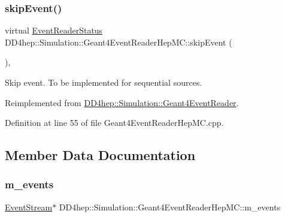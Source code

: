 \subsubsection{\texorpdfstring{skip\+Event()}{skipEvent()}}
{\footnotesize\ttfamily virtual \hyperlink{class_d_d4hep_1_1_simulation_1_1_geant4_event_reader_ae4f4bc83ffcf5b0c1868ad78859851e7}{Event\+Reader\+Status} D\+D4hep\+::\+Simulation\+::\+Geant4\+Event\+Reader\+Hep\+M\+C\+::skip\+Event (\begin{DoxyParamCaption}{ }\end{DoxyParamCaption})\hspace{0.3cm}{\ttfamily [inline]}, {\ttfamily [virtual]}}



Skip event. To be implemented for sequential sources. 



Reimplemented from \hyperlink{class_d_d4hep_1_1_simulation_1_1_geant4_event_reader_a9381626ad4f4fa20e304414f6654ee03}{D\+D4hep\+::\+Simulation\+::\+Geant4\+Event\+Reader}.



Definition at line 55 of file Geant4\+Event\+Reader\+Hep\+M\+C.\+cpp.



\subsection{Member Data Documentation}
\hypertarget{class_d_d4hep_1_1_simulation_1_1_geant4_event_reader_hep_m_c_a0e1d85baaaec0af5a18bb63ec3cdd20a}{}\label{class_d_d4hep_1_1_simulation_1_1_geant4_event_reader_hep_m_c_a0e1d85baaaec0af5a18bb63ec3cdd20a} 
\subsubsection{\texorpdfstring{m\+\_\+events}{m\_events}}
{\footnotesize\ttfamily \hyperlink{class_d_d4hep_1_1_simulation_1_1_geant4_event_reader_hep_m_c_a260380eb48d2adb971aaade903a47da8}{Event\+Stream}$\ast$ D\+D4hep\+::\+Simulation\+::\+Geant4\+Event\+Reader\+Hep\+M\+C\+::m\+\_\+events\hspace{0.3cm}{\ttfamily [protected]}}



